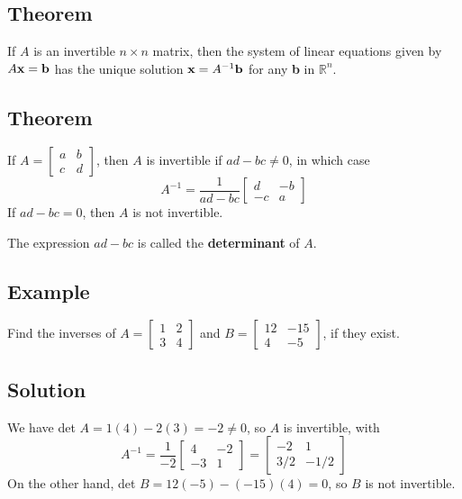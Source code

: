 \subsection*{Theorem}
If $A$ is an invertible $n\times n$ matrix, then the system of linear equations
given by $A\mathbf{x}=\mathbf{b}$ has the unique solution $\mathbf{x}=A^{-1}\mathbf{b}$ for any \textbf{b} in $\mathbb{R}^n$.

\subsection*{Theorem}
If $A=\begin{bmatrix}
        a & b \\
        c & d
    \end{bmatrix}$, then $A$ is invertible if $ad-bc\neq0$, in which case
\[A^{-1}=\frac{1}{ad-bc}\begin{bmatrix}
        d  & -b \\
        -c & a
    \end{bmatrix}\]
If $ad-bc=0$, then $A$ is not invertible.

The expression $ad-bc$ is called the \textbf{determinant} of $A$.

\subsection*{Example}
Find the inverses of $A=\begin{bmatrix}
        1 & 2 \\
        3 & 4
    \end{bmatrix}$ and $B=\begin{bmatrix}
        12 & -15 \\
        4  & -5
    \end{bmatrix}$, if they exist.

\subsection*{Solution}
We have det $A=1(4)-2(3)=-2\neq0$, so $A$ is invertible, with
\[A^{-1}=\frac{1}{-2}\begin{bmatrix}
        4  & -2 \\
        -3 & 1
    \end{bmatrix}=\begin{bmatrix}
        -2  & 1    \\
        3/2 & -1/2
    \end{bmatrix}\]
On the other hand, det $B=12(-5)-(-15)(4)=0$, so $B$ is not invertible.

